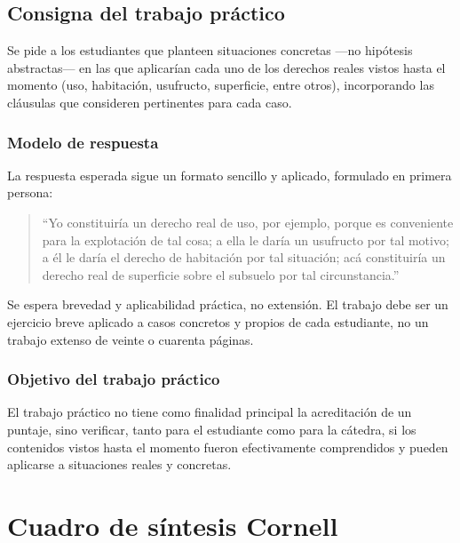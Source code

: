 \documentclass[12pt,oneside]{book}
\begin{document}
\section{Consigna del trabajo práctico}

Se pide a los estudiantes que planteen situaciones concretas ---no hipótesis abstractas--- en las que aplicarían cada uno de los derechos reales vistos hasta el momento (uso, habitación, usufructo, superficie, entre otros), incorporando las cláusulas que consideren pertinentes para cada caso.

\subsection{Modelo de respuesta}

La respuesta esperada sigue un formato sencillo y aplicado, formulado en primera persona:

\begin{quote}
``Yo constituiría un derecho real de uso, por ejemplo, porque es conveniente para la explotación de tal cosa; a ella le daría un usufructo por tal motivo; a él le daría el derecho de habitación por tal situación; acá constituiría un derecho real de superficie sobre el subsuelo por tal circunstancia.''
\end{quote}

Se espera brevedad y aplicabilidad práctica, no extensión. El trabajo debe ser un ejercicio breve aplicado a casos concretos y propios de cada estudiante, no un trabajo extenso de veinte o cuarenta páginas.

\subsection{Objetivo del trabajo práctico}

El trabajo práctico no tiene como finalidad principal la acreditación de un puntaje, sino verificar, tanto para el estudiante como para la cátedra, si los contenidos vistos hasta el momento fueron efectivamente comprendidos y pueden aplicarse a situaciones reales y concretas.


\chapter*{Cuadro de síntesis Cornell}
\end{document}
